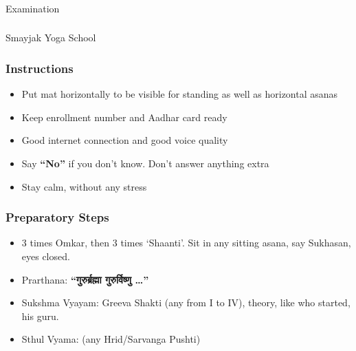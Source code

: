 \begin{frame}[fragile]\frametitle{}
\begin{center}
{\Large Examination}
\end{center}
\end{frame}


\begin{frame}[fragile]\frametitle{}
\begin{center}
{\Large Smayjak Yoga School}
\end{center}
\end{frame}

\begin{frame}[fragile]\frametitle{Instructions}
    \begin{itemize}
        \item Put mat horizontally to be visible for standing as well as horizontal asanas
        \item Keep enrollment number and Aadhar card ready
        \item Good internet connection and good voice quality
        \item Say \textbf{“No”} if you don’t know. Don’t answer anything extra
        \item Stay calm, without any stress
    \end{itemize}
\end{frame}

\begin{frame}[fragile]\frametitle{Preparatory Steps}
    \begin{itemize}
        \item 3 times Omkar, then 3 times ‘Shaanti’. Sit in any sitting asana, say Sukhasan, eyes closed.
        \item Prarthana: \textbf{“गुरुर्ब्रह्मा गुरुर्विष्णु …”}
        \item Sukshma Vyayam: Greeva Shakti (any from I to IV), theory, like who started, his guru.
        \item Sthul Vyama: (any Hrid/Sarvanga Pushti)
    \end{itemize}
\end{frame}

